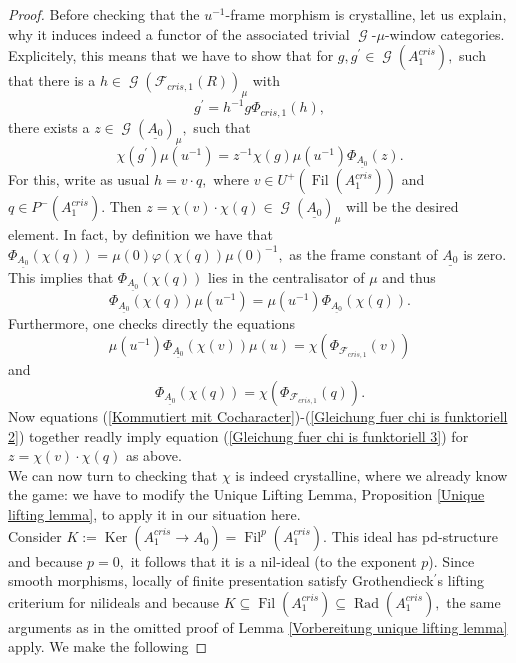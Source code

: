 \documentclass[a4paper,10,5 pt]{amsart}
\theoremstyle{definition}
\DeclareMathOperator{\Rad}{Rad}
\DeclareMathOperator{\Ker}{Ker}
\DeclareMathOperator{\Fil}{Fil}
\DeclareMathOperator{\G}{\mathcal{G}}
\begin{document}
\begin{proof}
Before checking that the $u^{-1}$-frame morphism is crystalline, let us explain, why it induces indeed a functor of the associated trivial $\G$-$\mu$-window categories.
Explicitely, this means that we have to show that for $g,g^{\prime}\in \G(A_{1}^{cris}),$ such that there is a $h\in\G(\mathcal{F}_{cris,1}(R))_{\mu}$ with
\begin{equation}
g^{\prime}=h^{-1}g\Phi_{cris,1}(h),
\end{equation}
there exists a $z\in \G(\underline{A_{0}})_{\mu},$ such that
\begin{equation}\label{Gleichung fuer chi is funktoriell 3}
\chi(g^{\prime})\mu(u^{-1})=z^{-1}\chi(g)\mu(u^{-1})\Phi_{\underline{A_{0}}}(z).
\end{equation}
For this, write as usual $h=v\cdot q,$ where $v\in U^{+}(\Fil(A_{1}^{cris}))$ and $q\in P^{-}(A_{1}^{cris}).$ Then $z=\chi(v)\cdot \chi(q)\in\G(\underline{A_{0}})_{\mu}$ will be the desired element. In fact, by definition we have that $\Phi_{\underline{A_{0}}}(\chi(q))=\mu(0)\varphi(\chi(q))\mu(0)^{-1},$ as the frame constant of $\underline{A_{0}}$ is zero. This implies that $\Phi_{\underline{A_{0}}}(\chi(q))$ lies in the centralisator of $\mu$ and thus
\begin{equation}\label{Kommutiert mit Cocharacter}
\Phi_{\underline{A_{0}}}(\chi(q))\mu(u^{-1})=\mu(u^{-1})\Phi_{\underline{A_{0}}}(\chi(q)).
\end{equation}
Furthermore, one checks directly the equations
\begin{equation}\label{Gleichung fuer chi ist funktoriell 1}
\mu(u^{-1})\Phi_{\underline{A_{0}}}(\chi(v))\mu(u)=\chi(\Phi_{\mathcal{F}_{cris,1}}(v))
\end{equation}
and
\begin{equation}\label{Gleichung fuer chi is funktoriell 2}
\Phi_{\underline{A_{0}}}(\chi(q))=\chi(\Phi_{\mathcal{F}_{cris,1}}(q)).
\end{equation}
Now equations (\ref{Kommutiert mit Cocharacter})-(\ref{Gleichung fuer chi is funktoriell 2}) together readly imply  equation (\ref{Gleichung fuer chi is funktoriell 3}) for $z=\chi(v)\cdot \chi(q)$ as above.
\\
We can now turn to checking that $\chi$ is indeed crystalline, where we already know the game: we have to modify the Unique Lifting Lemma, Proposition \ref{Unique lifting lemma}, to apply it in our situation here.
\\
Consider $K:=\Ker(A_{1}^{cris}\rightarrow A_{0})=\Fil^{p}(A_{1}^{cris}).$ This ideal has pd-structure and because $p=0,$ it follows that it is a nil-ideal (to the exponent $p$). Since smooth morphisms, locally of finite presentation satisfy Grothendieck$^{\prime}$s lifting criterium for nilideals and because $K\subseteq \Fil(A_{1}^{cris})\subseteq \Rad(A_{1}^{cris}),$ the same arguments as in the omitted proof of Lemma \ref{Vorbereitung unique lifting lemma} apply. We make the following

\end{proof}
\end{document}
